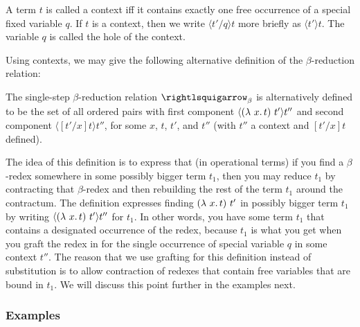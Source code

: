 \begin{definition}[context]
  A term $t$ is called a context iff it contains exactly one free
  occurrence of a special fixed variable $q$.  If $t$
  is a context, then we write $\langle t'/q \rangle t$ more briefly as
  $\langle t' \rangle t$.  The variable $q$ is called the hole of the
  context.
  \end{definition}

\noindent Using contexts, we may give the following alternative definition of the $\beta$-reduction relation:

\begin{definition}
\label{def:betactxt}
The single-step $\beta$-reduction relation
$\betar$ is alternatively defined to be the set of all ordered pairs with first component $\langle (\lambda\ x.\, t)\ t' \rangle t''$
  and second component $\langle [t'/x]t \rangle t''$, for some $x$, $t$, $t'$, and $t''$ (with $t''$ a context and $[t'/x]t$ defined).
\end{definition}

The idea of this definition is to express that (in operational terms)
if you find a $\beta$-redex somewhere in some possibly bigger term
$t_1$, then you may reduce $t_1$ by contracting that $\beta$-redex and
then rebuilding the rest of the term $t_1$ around the contractum.  The
definition expresses finding $(\lambda\ x.\, t)\ t'$ in possibly bigger
term $t_1$ by writing $\langle(\lambda\ x.\, t)\ t'\rangle t''$ for $t_1$.
In other words, you have some term $t_1$ that contains a designated
occurrence of the redex, because $t_1$ is what you get when you graft
the redex in for the single occurrence of special variable $q$ in some
context $t''$.  The reason that we use grafting for this definition
instead of substitution is to allow contraction of redexes that
contain free variables that are bound in $t_1$.  We will discuss this
point further in the examples next.

\subsubsection{Examples}
\label{sec:betaex}

